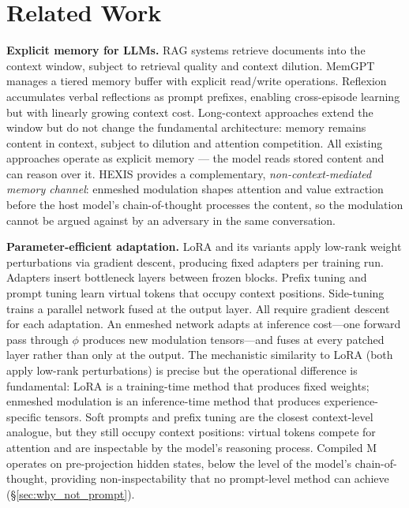 \section{Related Work}
\label{sec:related_work}

\textbf{Explicit memory for LLMs.} RAG systems \citep{lewis2020retrieval} retrieve documents into the context window, subject to retrieval quality and context dilution. MemGPT \citep{packer2023memgpt} manages a tiered memory buffer with explicit read/write operations. Reflexion \citep{shinn2023reflexion} accumulates verbal reflections as prompt prefixes, enabling cross-episode learning but with linearly growing context cost. Long-context approaches extend the window but do not change the fundamental architecture: memory remains content in context, subject to dilution and attention competition. All existing approaches operate as explicit memory --- the model reads stored content and can reason over it. HEXIS provides a complementary, \emph{non-context-mediated memory channel}: enmeshed modulation shapes attention and value extraction before the host model's chain-of-thought processes the content, so the modulation cannot be argued against by an adversary in the same conversation.

\textbf{Parameter-efficient adaptation.} LoRA \citep{hu2021lora} and its variants apply low-rank weight perturbations via gradient descent, producing fixed adapters per training run. Adapters \citep{houlsby2019parameter} insert bottleneck layers between frozen blocks. Prefix tuning \citep{li2021prefix} and prompt tuning \citep{lester2021power} learn virtual tokens that occupy context positions. Side-tuning \citep{zhang2019side} trains a parallel network fused at the output layer. All require gradient descent for each adaptation. An enmeshed network adapts at inference cost---one forward pass through $\phi$ produces new modulation tensors---and fuses at every patched layer rather than only at the output. The mechanistic similarity to LoRA (both apply low-rank perturbations) is precise but the operational difference is fundamental: LoRA is a training-time method that produces fixed weights; enmeshed modulation is an inference-time method that produces experience-specific tensors. Soft prompts and prefix tuning are the closest context-level analogue, but they still occupy context positions: virtual tokens compete for attention and are inspectable by the model's reasoning process. Compiled M operates on pre-projection hidden states, below the level of the model's chain-of-thought, providing non-inspectability that no prompt-level method can achieve (\S\ref{sec:why_not_prompt}).

